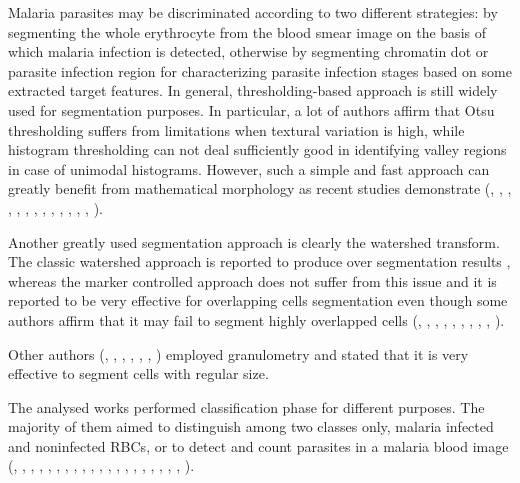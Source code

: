 \documentclass[sensors,review,submit,moreauthors,pdftex,10pt,a4paper]{mdpi}
\begin{document}
	Malaria parasites may be discriminated according to two different strategies: by segmenting the whole erythrocyte from the blood smear image on the basis of which malaria infection is detected, otherwise by segmenting chromatin dot or parasite infection region for characterizing parasite infection stages based on some extracted target features.
	In general, thresholding-based approach is still widely used for segmentation purposes. In particular, a lot of authors affirm that Otsu thresholding suffers from limitations when textural variation is high, while histogram thresholding can not deal sufficiently good in identifying valley regions in case of unimodal histograms. However, such a simple and fast approach can greatly benefit from mathematical morphology as recent studies demonstrate (\cite{Ahirwar2012}, \cite{Anggraini2011}, \cite{Arco2014}, \cite{DiRuberto2002}, \cite{Elter2011}, \cite{Ghosh2011},  \cite{Kareem2011}, \cite{Mushabe2013},  \cite{Rosado2017}, \cite{Ross2006}, \cite{Savkare2011b}, \cite{Savkare2015}, \cite{Somasekar2017}, \cite{Tek2010}).
	
	Another greatly used segmentation approach is clearly the watershed transform. The classic watershed approach is reported to produce over segmentation results \cite{Savkare2011b}, whereas the marker controlled approach does not suffer from this issue and it is reported to be very effective for overlapping cells segmentation even though some authors affirm that it may fail to segment highly overlapped cells  (\cite{Das2011}, \cite{Das2013}, \cite{Das2014}, \cite{Das2015}, \cite{Devi2017}, \cite{Khan2011}, \cite{Romero2016}, \cite{Savkare2015}, \cite{Savkare2011a}, \cite{Springl2009}).
	
	Other authors (\cite{Ahirwar2012}, \cite{DiRuberto2002}, \cite{Khan2011}, \cite{Mushabe2013}, \cite{Ross2006}, \cite{Soni2011}, \cite{Tek2010}) employed granulometry and stated that it is very effective to segment cells with regular size.
	
	The analysed works performed classification phase for different purposes. The majority of them aimed to distinguish among two classes only, malaria infected and noninfected RBCs, or to detect and count parasites in a malaria blood image (\cite{Anggraini2011}, \cite{Arco2014}, \cite{Das2011}, \cite{Dave2017}, \cite{Das2015}, \cite{DiRuberto2002}, \cite{Elter2011}, \cite{Ghosh2011}, \cite{Kareem2012}, \cite{Khan2014}, \cite{Malihi2013}, \cite{Mushabe2013}, \cite{Oliveira2017}, \cite{Savkare2011b}, \cite{Savkare2011a}, \cite{Somasekar2011}, \cite{Somasekar2015}, \cite{Somasekar2017}, \cite{Soni2011}, \cite{Sulist2015}, \cite{Tek2006}).
	
\end{document}
